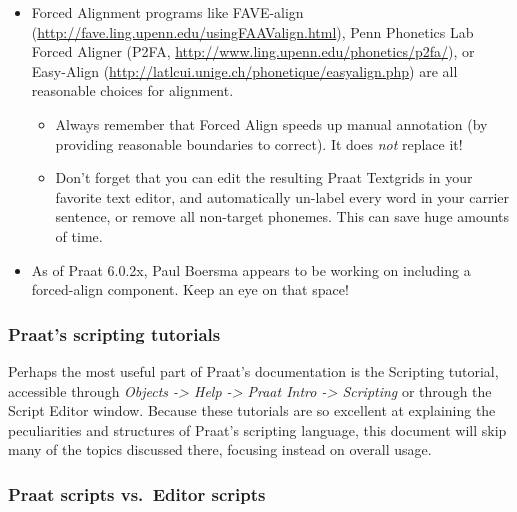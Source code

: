 \documentclass[11pt]{article}
\def\tightlist{}
\begin{document}
\begin{itemize}
  \begin{itemize}
  \tightlist
  \item
    Forced Alignment programs like FAVE-align
    (\url{http://fave.ling.upenn.edu/usingFAAValign.html}), Penn
    Phonetics Lab Forced Aligner (P2FA,
    \url{http://www.ling.upenn.edu/phonetics/p2fa/}), or Easy-Align
    (\url{http://latlcui.unige.ch/phonetique/easyalign.php}) are all
    reasonable choices for alignment.

    \begin{itemize}
    \tightlist
    \item
      Always remember that Forced Align speeds up manual annotation (by
      providing reasonable boundaries to correct). It does \emph{not}
      replace it!
    \item
      Don't forget that you can edit the resulting Praat Textgrids in
      your favorite text editor, and automatically un-label every word
      in your carrier sentence, or remove all non-target phonemes. This
      can save huge amounts of time.
    \end{itemize}
  \item
    As of Praat 6.0.2x, Paul Boersma appears to be working on including
    a forced-align component. Keep an eye on that space!
  \end{itemize}
\end{itemize}

\hypertarget{praats-scripting-tutorials}{%
\subsubsection{Praat's scripting
tutorials}\label{praats-scripting-tutorials}}

Perhaps the most useful part of Praat's documentation is the Scripting
tutorial, accessible through \emph{Objects -\textgreater{} Help
-\textgreater{} Praat Intro -\textgreater{} Scripting} or through the
Script Editor window. Because these tutorials are so excellent at
explaining the peculiarities and structures of Praat's scripting
language, this document will skip many of the topics discussed there,
focusing instead on overall usage.

\hypertarget{praat-scripts-vs.-editor-scripts}{%
\subsubsection{Praat scripts vs.~Editor
scripts}\label{praat-scripts-vs.-editor-scripts}}
\end{document}

